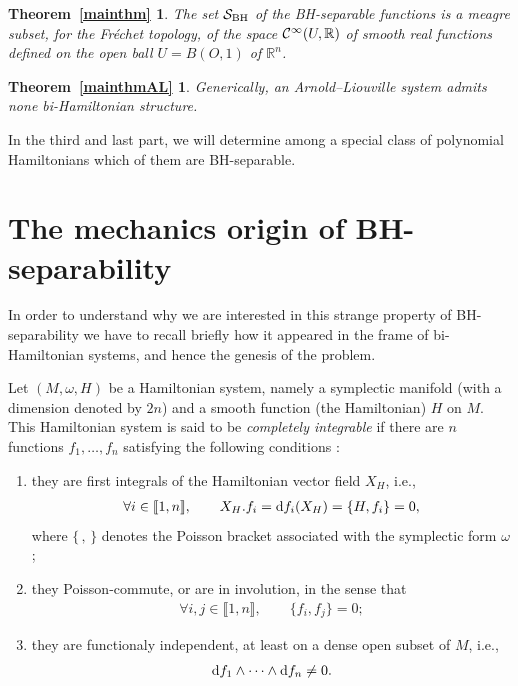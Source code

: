 \documentclass[10pt,a4paper]{amsart}
\numberwithin{equation}{section}
\newtheorem*{Theorem1}{Theorem~\ref{mainthm}}
\newtheorem*{Theorem2}{Theorem~\ref{mainthmAL}}
\begin{document}
\begin{Theorem1}
The set ${\cal S}_{\rm BH}$ of the BH-separable functions is a meagre subset, for the Fr\'echet topology, of the space ${\cal C}^{\infty}(U,\mathbb{R})$ of smooth real functions defined on the open ball $U=B(O,1)$ of $\mathbb{R}^n$.
\end{Theorem1}

\begin{Theorem2} Generically, an Arnold--Liouville system admits none bi-Hamiltonian structure.
\end{Theorem2}

In the third and last part, we will determine among a special class of polynomial Hamiltonians which of them are BH-separable.

\section{The mechanics origin of BH-separability}

In order to understand why we are interested in this strange property of BH-separability we have to recall briefly how it appeared in the frame of bi-Hamiltonian systems, and hence the genesis of the problem.

Let $(M,\omega,H)$ be a Hamiltonian system, namely a symplectic manifold (with a dimension denoted by $2n$) and a smooth function (the Hamiltonian) $H$ on $M$. This Hamiltonian system is said to be {\it completely integrable} if there are $n$ functions $f_1,\dots,f_n$ satisfying the following conditions \cite{AbMa, Arn,LiMa}:
\begin{enumerate}\itemsep=0pt
\item[(1)] they are first integrals of the Hamiltonian vector field $X_H$, i.e.,
\begin{gather*}
\forall i\in\llbracket 1,n\rrbracket,\qquad X_H.f_i={\rm d}f_i(X_H)=\{H,f_i\}=0,
\end{gather*}
where $\{\, ,\,\}$ denotes the Poisson bracket associated with the symplectic form $\omega$;

\item[(2)] they Poisson-commute, or are in involution, in the sense that
\begin{gather*}
\forall i,j\in\llbracket 1,n\rrbracket,\qquad
\{f_i,f_j\}=0;
\end{gather*}

\item[(3)] they are functionaly independent, at least on a dense open subset of $M$, i.e.,
\begin{gather*}
{\rm d}f_1\wedge\cdots\wedge {\rm d}f_n\not=0.
\end{gather*}
\end{enumerate}
\end{document}
